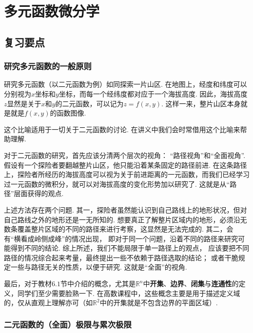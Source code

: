 \clearpage
\section{多元函数微分学}

\subsection{复习要点} \par

\subsubsection{研究多元函数的一般原则}\par

研究多元函数（以二元函数为例）如同探索一片山区.
在地图上，经度和纬度可以分别视为$x$坐标和$y$坐标，而每一个经纬度都对应于一个海拔高度.
因此，海拔高度$z$显然是关于$x$和$y$的二元函数，可以记为$z = f(x,y)$.
这样一来，整片山区本身就是就是$f(x,y)$的函数图像.

这个比喻适用于一切关于二元函数的讨论.
在讲义中我们会时常借用这个比喻来帮助理解.\par
对于二元函数的研究，首先应该分清两个层次的视角：
“路径视角”和“全面视角”.
假设有一个探险者要翻越整片山区，他只能沿着某条固定的路径前进.
在这条路径上，探险者所经历的海拔高度可以视为关于前进距离的一元函数，而我们已经学习过一元函数的微积分，就可以对海拔高度的变化形势加以研究了.
这就是从“路径”层面获得的观点.

上述方法存在两个问题. 其一，探险者虽然能认识到自己路线上的地形状况，但对自己路线之外的地形还是一无所知的.
想要真正了解整片区域内的地形，必须沿无数条覆盖整片区域的不同的路径来进行考察，这显然是无法完成的.
其二，会有“横看成岭侧成峰”的情况出现，
即对于同一个问题，沿着不同的路径来研究可能得到不同的结论.
综上所述，我们不能局限于单一路径上的观点，
应该要把不同路径的情况综合起来考量，最终提出一些不依赖于路径选取的结论；
或者干脆规定一些与路径无关的性质，以便于研究. 这就是“全面”的视角.\par
最后，对于教材$6.1$节中介绍的概念，尤其是$\mathbb{R}^n$中\textbf{开集}、\textbf{边界}、\textbf{闭集}与\textbf{连通性}的定义，同学们至少需要脸熟一下.
在高数课程中，这些概念主要是用于描述定义域的，仅从直观上理解亦可（如$\mathbb{R}^2$中的开集就是不包含边界的平面区域）.

\subsubsection{二元函数的（全面）极限与累次极限} \par

